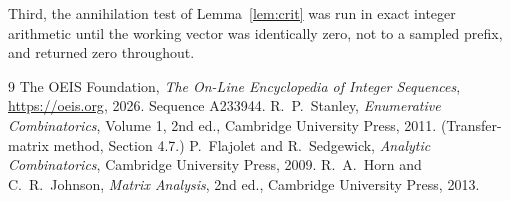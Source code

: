 \documentclass[11pt,a4paper]{article}
\theoremstyle{plain}
\theoremstyle{definition}
\begin{document}
Third, the annihilation test of Lemma~\ref{lem:crit} was run in exact integer arithmetic
until the working vector was identically zero, not to a sampled prefix, and returned zero
throughout.

\begin{thebibliography}{9}
 The OEIS Foundation, \emph{The On-Line Encyclopedia of Integer
Sequences}, \url{https://oeis.org}, 2026. Sequence A233944.
 R.~P.~Stanley, \emph{Enumerative Combinatorics}, Volume 1, 2nd ed.,
Cambridge University Press, 2011. (Transfer-matrix method, Section 4.7.)
 P.~Flajolet and R.~Sedgewick, \emph{Analytic Combinatorics}, Cambridge
University Press, 2009.
 R.~A.~Horn and C.~R.~Johnson, \emph{Matrix Analysis}, 2nd ed., Cambridge
University Press, 2013.
\end{thebibliography}
\end{document}
